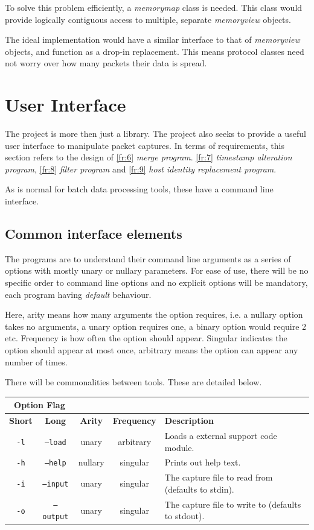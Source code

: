 \documentclass[10pt,a4paper,notitlepage]{report}
\begin{document}
To solve this problem efficiently, a \emph{memorymap} class is needed. This class would provide logically contiguous access to multiple, separate \emph{memoryview} objects.

The ideal implementation would have a similar interface to that of \emph{memoryview} objects, and function as a drop-in replacement. This means protocol classes need not worry over how many packets their data is spread.

\section{User Interface}
The project is more then just a library. The project also seeks to provide a useful user interface to manipulate packet captures. In terms of requirements, this section refers to the design of \ref{fr:6} \emph{merge program}. \ref{fr:7} \emph{timestamp alteration program}, \ref{fr:8} \emph{filter program} and \ref{fr:9} \emph{host identity replacement program}.

As is normal for batch data processing tools, these have a command line interface.

\subsection{Common interface elements}
The programs are to understand their command line arguments as a series of options with mostly unary or nullary parameters. For ease of use, there will be no specific order to command line options and no explicit options will be mandatory, each program having \emph{default} behaviour.

Here, arity means how many arguments the option requires, i.e. a nullary option takes no arguments,  a unary option requires one, a binary option would require 2 etc.
Frequency is how often the option should appear. Singular indicates the option should appear at most once, arbitrary means the option can appear any number of times.

There will be commonalities between tools. These are detailed below.

\begin{tabularx}{\textwidth}{|c|c|c|c|X|}
\cline{1-2}
\multicolumn{2}{|c|}{\textbf{Option Flag}} & \multicolumn{3}{c}{}\\ \hline
\textbf{Short} & \textbf{Long} & \textbf{Arity} & \textbf{Frequency} & \textbf{Description} \\ \hline
\texttt{-l} & \texttt{--load} & unary & arbitrary & Loads a external support code module.\\ \hline
\texttt{-h} & \texttt{--help} & nullary & singular & Prints out help text.\\\hline
\texttt{-i} & \texttt{--input} & unary & singular & The capture file to read from (defaults to stdin).\\ \hline
\texttt{-o} & \texttt{--output} & unary & singular & The capture file to write to (defaults to stdout).\\ \hline
\end{tabularx}
\end{document}
